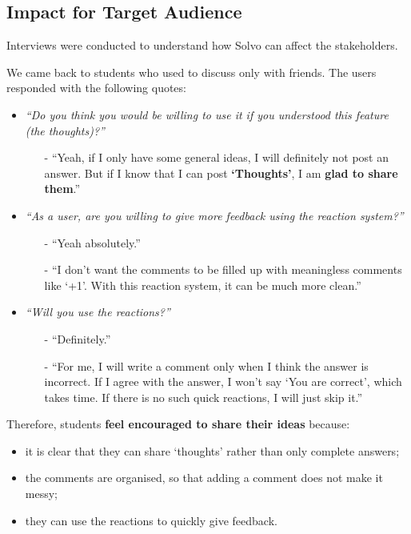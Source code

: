 \documentclass[a4paper]{article}
\begin{document}
    \subsection*{Impact for Target Audience}

    \noindent Interviews were conducted to understand how Solvo can affect the stakeholders.

    We came back to students who used to discuss only with friends.
    The users responded with the following quotes:
    \begin{itemize}
        \item \textit{``Do you think you would be willing to use it if you understood this feature (the thoughts)?''}
        \begin{itemize}
            \item[-] ``Yeah, if I only have some general ideas, I will definitely not post an answer.
            But if I know that I can post \textbf{`Thoughts'}, I am \textbf{glad to share them}.''
        \end{itemize}

        \item
        \textit{``As a user, are you willing to give more feedback using the reaction system?''}
        \begin{itemize}
            \item[-] ``Yeah absolutely.''
            \item[-] ``I don’t want the comments to be filled up with meaningless comments like `+1'.
            With this reaction system, it can be much more clean.''
        \end{itemize}

        \item \textit{``Will you use the reactions?''}
        \begin{itemize}
            \item[-] ``Definitely.''
            \item[-] ``For me, I will write a comment only when I think the answer is incorrect.
            If I agree with the answer, I won't say `You are correct', which takes time.
            If there is no such quick reactions, I will just skip it.''
        \end{itemize}
    \end{itemize}

    Therefore, students \textbf{feel encouraged to share their ideas} because:
    \begin{itemize}
        \item it is clear that they can share `thoughts' rather than only complete answers;
        \item the comments are organised, so that adding a comment does not make it messy;
        \item they can use the reactions to quickly give feedback.
    \end{itemize}
\end{document}
